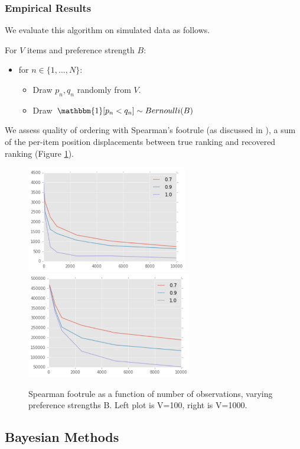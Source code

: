 \subsubsection{Empirical Results}

We evaluate this algorithm on simulated data as follows.

For $V$ items and preference strength $B$:

\begin{itemize}
	\item for $n \in \{1, ..., N\}$:
	\begin{itemize}
		\item Draw $p_n, q_n$ randomly from $V$.
		\item Draw $\mathbbm{1}[p_n < q_n] \sim Bernoulli(B)$
	\end{itemize}
\end{itemize}

We assess quality of ordering with Spearman's footrule (as discussed in \cite{jordan}), a sum of the per-item position displacements between true ranking and recovered ranking (Figure \ref{fig:pr_0}).

\begin{figure}[!htb]
\includegraphics[width=	7cm]{images/pr_100}
\hfill
\includegraphics[width=7.2cm]{images/pr_1000}
\caption{Spearman footrule as a function of number of observations, varying preference strengths B. Left plot is V=100, right is V=1000.}
\label{fig:pr_0} 
\end{figure}

\subsection{Bayesian Methods}

